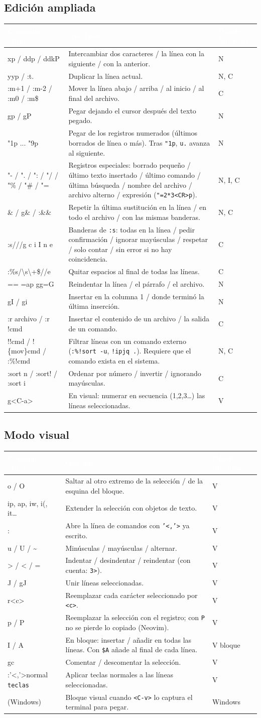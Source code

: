 \documentclass[8pt,a4paper,landscape]{extarticle}
\newcommand{\kk}[1]{\texttt{#1}}
\newcommand{\bs}{\textbackslash{}}
\newcommand{\tl}{\textasciitilde{}}
\newenvironment{cht}{%
  \begin{longtable}{>{\raggedright\arraybackslash\ttfamily}p{0.27\textwidth}
                    >{\raggedright\arraybackslash}p{0.46\textwidth}
                    >{\raggedright\arraybackslash}p{0.21\textwidth}}
  \rowcolor{accent}\textcolor{white}{\textbf{\rmfamily Comando / atajo}} &
  \textcolor{white}{\textbf{Qué hace}} & \textcolor{white}{\textbf{Dónde funciona}} \\
  \endhead
}{\end{longtable}}
\newcommand{\rr}[3]{#1 & #2 & #3 \\}
\newcommand{\rg}[3]{\rowcolor{rowgray}\relax #1 & #2 & #3 \\}
\let\oldsubsection\subsection
\renewcommand{\subsection}{\Needspace{9\baselineskip}\oldsubsection}
\begin{document}
\subsection{Edición ampliada}
\begin{cht}
\rg{xp / ddp / ddkP}{Intercambiar dos caracteres / la línea con la siguiente / con la anterior.}{N}
\rr{yyp / :t.}{Duplicar la línea actual.}{N, C}
\rg{:m+1 / :m-2 / :m0 / :m\$}{Mover la línea abajo / arriba / al inicio / al final del archivo.}{C}
\rr{gp / gP}{Pegar dejando el cursor después del texto pegado.}{N}
\rg{"1p ... "9p}{Pegar de los registros numerados (últimos borrados de línea o más). Tras \kk{"1p}, \kk{u.} avanza al siguiente.}{N}
\rr{"- / ". / ": / "/ / "\% / "\# / "=}{Registros especiales: borrado pequeño / último texto insertado / último comando / última búsqueda / nombre del archivo / archivo alterno / expresión (\kk{"=2*3<CR>p}).}{N, I, C}
\rg{\&  / g\& / :\&\&}{Repetir la última sustitución en la línea / en todo el archivo / con las mismas banderas.}{N, C}
\rr{:s///g  c  i  I  n  e}{Banderas de \kk{:s}: todas en la línea / pedir confirmación / ignorar mayúsculas / respetar / solo contar / sin error si no hay coincidencia.}{C}
\rg{:\%s/\bs s\bs +\$//e}{Quitar espacios al final de todas las líneas.}{C}
\rr{==  =ap  gg=G}{Reindentar la línea / el párrafo / el archivo.}{N}
\rg{gI / gi}{Insertar en la columna 1 / donde terminó la última inserción.}{N}
\rr{:r archivo / :r !cmd}{Insertar el contenido de un archivo / la salida de un comando.}{C}
\rg{!!cmd / !\{mov\}cmd / :\%!cmd}{Filtrar líneas con un comando externo (\kk{:\%!sort -u}, \kk{!ipjq .}). Requiere que el comando exista en el sistema.}{N, C}
\rr{:sort n / :sort! / :sort i}{Ordenar por número / invertir / ignorando mayúsculas.}{C}
\rg{g<C-a>}{En visual: numerar en secuencia (1,2,3\ldots) las líneas seleccionadas.}{V}
\end{cht}

\subsection{Modo visual}
\begin{cht}
\rg{o / O}{Saltar al otro extremo de la selección / de la esquina del bloque.}{V}
\rr{ip, ap, iw, i(, it\ldots}{Extender la selección con objetos de texto.}{V}
\rg{:}{Abre la línea de comandos con \kk{'<,'>} ya escrito.}{V}
\rr{u / U / \tl}{Minúsculas / mayúsculas / alternar.}{V}
\rg{> / < / =}{Indentar / desindentar / reindentar (con cuenta: \kk{3>}).}{V}
\rr{J / gJ}{Unir líneas seleccionadas.}{V}
\rg{r<c>}{Reemplazar cada carácter seleccionado por \kk{<c>}.}{V}
\rr{p / P}{Reemplazar la selección con el registro; con \kk{P} no se pierde lo copiado (Neovim).}{V}
\rg{I / A}{En bloque: insertar / añadir en todas las líneas. Con \kk{\$A} añade al final de cada línea.}{V bloque}
\rr{gc}{Comentar / descomentar la selección.}{V}
\rg{:'<,'>normal \kk{teclas}}{Aplicar teclas normales a las líneas seleccionadas.}{V}
\rr{<C-q> (Windows)}{Bloque visual cuando \kk{<C-v>} lo captura el terminal para pegar.}{Windows}
\end{cht}
\end{document}
